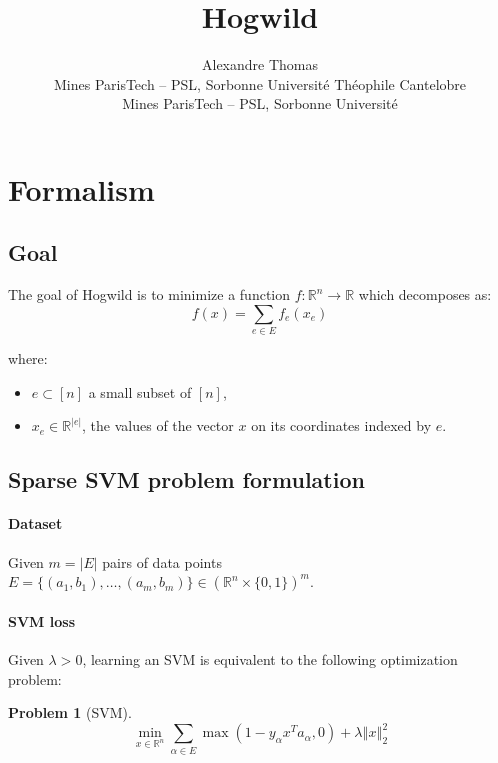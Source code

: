 \documentclass[twoside,11pt]{article}
\newcommand{\norm}[1]{\left\Vert #1 \right\Vert}
\newcommand{\todo}[1]{\textbf{\color{red}{[TODO: #1]}}}
\newtheorem{problem}{Problem}
\begin{document}
\title{Hogwild} 
\author{%
\name Alexandre Thomas \\
\addr Mines ParisTech -- PSL, Sorbonne Université
\AND
\name Théophile Cantelobre\\
\addr Mines ParisTech -- PSL, Sorbonne Université
}

\maketitle


\todo{Convert to OCO course notation?}

\section{Formalism}
\subsection{Goal} The goal of Hogwild is to minimize a function $f: \mathbb R^n \rightarrow \mathbb R$ which decomposes as:
\begin{equation*}
    f(x) = \sum_{e\in E}f_e(x_e)
\end{equation*}

where:
\begin{itemize}
    \item $e\subset [n]$ a small subset of $[n]$,
    \item $x_e\in\mathbb R^{\vert e \vert}$, the values of the vector $x$ on its coordinates indexed by $e$.
\end{itemize}

\subsection{Sparse SVM problem formulation}
\paragraph{Dataset}
Given $m = \vert E \vert$ pairs of data points  $E = \lbrace (a_1, b_1), \ldots, (a_m, b_m)\rbrace\in \left(\mathbb R^n \times \lbrace 0, 1\rbrace\right)^m$.

\paragraph{SVM loss} Given $\lambda > 0$, learning an SVM is equivalent to the following optimization problem:
\begin{problem}[SVM]\label{prob:svm}
    \begin{equation*}
        \min_{x\in\mathbb R^n}\sum_{\alpha \in E}\max(1- y_\alpha x^Ta_\alpha, 0) + \lambda\norm{x}_2^2
    \end{equation*}
\end{problem}
\end{document}
